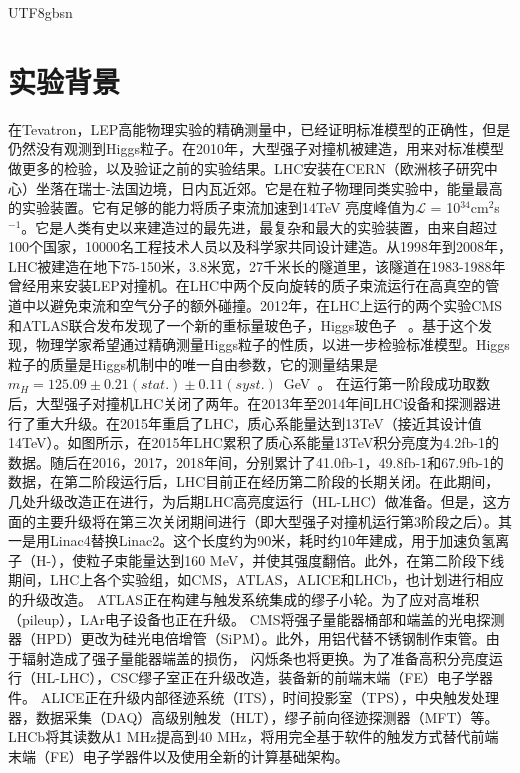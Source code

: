 \begin{CJK}{UTF8}{gbsn}
	\section{实验背景} \label{exp_bkg_chinese}
	在Tevatron，LEP高能物理实验的精确测量中，已经证明标准模型的正确性，但是仍然没有观测到Higgs粒子。在2010年，大型强子对撞机被建造，用来对标准模型做更多的检验，以及验证之前的实验结果。LHC安装在CERN（欧洲核子研究中心）坐落在瑞士-法国边境，日内瓦近郊。它是在粒子物理同类实验中，能量最高的实验装置。它有足够的能力将质子束流加速到14TeV 亮度峰值为$\mathscr{L}$ = 10$^{34}$cm$^{2}$s$^{-1}$。它是人类有史以来建造过的最先进，最复杂和最大的实验装置，由来自超过100个国家，10000名工程技术人员以及科学家共同设计建造。从1998年到2008年，LHC被建造在地下75-150米，3.8米宽，27千米长的隧道里，该隧道在1983-1988年曾经用来安装LEP对撞机。在LHC中两个反向旋转的质子束流运行在高真空的管道中以避免束流和空气分子的额外碰撞。2012年，在LHC上运行的两个实验CMS和ATLAS联合发布发现了一个新的重标量玻色子，Higgs玻色子 ~\cite{Reference20,Reference21}。基于这个发现，物理学家希望通过精确测量Higgs粒子的性质，以进一步检验标准模型。Higgs粒子的质量是Higgs机制中的唯一自由参数，它的测量结果是 $m_H = 125.09\pm 0.21(stat.)\pm0.11(syst.)$~GeV~\cite{Reference22}。 
在运行第一阶段成功取数后，大型强子对撞机LHC关闭了两年。在2013年至2014年间LHC设备和探测器进行了重大升级。在2015年重启了LHC，质心系能量达到13TeV（接近其设计值14TeV）。如图所示，在2015年LHC累积了质心系能量13TeV积分亮度为4.2fb-1的数据。随后在2016，2017，2018年间，分别累计了41.0fb-1，49.8fb-1和67.9fb-1的数据，在第二阶段运行后，LHC目前正在经历第二阶段的长期关闭。在此期间，几处升级改造正在进行，为后期LHC高亮度运行（HL-LHC）做准备。但是，这方面的主要升级将在第三次关闭期间进行（即大型强子对撞机运行第3阶段之后）。其一是用Linac4替换Linac2。这个长度约为90米，耗时约10年建成，用于加速负氢离子（H-），使粒子束能量达到160 MeV，并使其强度翻倍。此外，在第二阶段下线期间，LHC上各个实验组，如CMS，ATLAS，ALICE和LHCb，也计划进行相应的升级改造。
ATLAS正在构建与触发系统集成的缪子小轮。为了应对高堆积（pileup），LAr电子设备也正在升级。
CMS将强子量能器桶部和端盖的光电探测器（HPD）更改为硅光电倍增管（SiPM）。此外，用铝代替不锈钢制作束管。由于辐射造成了强子量能器端盖的损伤， 
闪烁条也将更换。为了准备高积分亮度运行（HL-LHC），CSC缪子室正在升级改造，装备新的前端末端（FE）电子学器件。
ALICE正在升级内部径迹系统（ITS），时间投影室（TPS），中央触发处理器，数据采集（DAQ）高级别触发（HLT），缪子前向径迹探测器（MFT）等。
LHCb将其读数从1 MHz提高到40 MHz，将用完全基于软件的触发方式替代前端末端（FE）电子学器件以及使用全新的计算基础架构。

\end{CJK}
